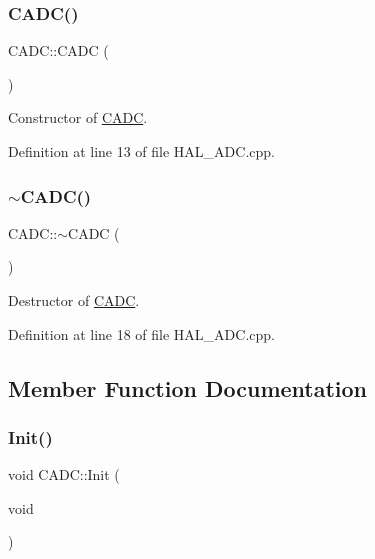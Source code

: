 \subsubsection{\texorpdfstring{C\+A\+D\+C()}{CADC()}}
{\footnotesize\ttfamily C\+A\+D\+C\+::\+C\+A\+DC (\begin{DoxyParamCaption}{ }\end{DoxyParamCaption})}



Constructor of \mbox{\hyperlink{class_c_a_d_c}{C\+A\+DC}}. 



Definition at line 13 of file H\+A\+L\+\_\+\+A\+D\+C.\+cpp.

\mbox{\label{class_c_a_d_c_ab8a5414ebb4c3707ac1575d63635efd8}} 
\subsubsection{\texorpdfstring{$\sim$\+C\+A\+D\+C()}{~CADC()}}
{\footnotesize\ttfamily C\+A\+D\+C\+::$\sim$\+C\+A\+DC (\begin{DoxyParamCaption}{ }\end{DoxyParamCaption})}



Destructor of \mbox{\hyperlink{class_c_a_d_c}{C\+A\+DC}}. 



Definition at line 18 of file H\+A\+L\+\_\+\+A\+D\+C.\+cpp.



\subsection{Member Function Documentation}
\mbox{\label{class_c_a_d_c_a09118c55821cd6f0c9b2e2d2edd40d33}} 
\subsubsection{\texorpdfstring{Init()}{Init()}}
{\footnotesize\ttfamily void C\+A\+D\+C\+::\+Init (\begin{DoxyParamCaption}\item[{void}]{ }\end{DoxyParamCaption})}



